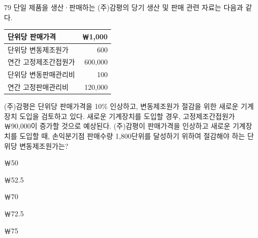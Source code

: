 \begin{question}{79}
단일 제품을 생산·판매하는 (주)감평의 당기 생산 및 판매 관련 자료는 다음과 같다.
\par{\small\centering\begin{tabular}{|l|r|}\hline
단위당 판매가격 & ￦1,000 \\ \hline
단위당 변동제조원가 & 600 \\ \hline
연간 고정제조간접원가 & 600,000 \\ \hline
단위당 변동판매관리비 & 100 \\ \hline
연간 고정판매관리비 & 120,000 \\ \hline
\end{tabular}\par}
(주)감평은 단위당 판매가격을 10\% 인상하고, 변동제조원가 절감을 위한 새로운 기계장치 도입을 검토하고 있다. 새로운 기계장치를 도입할 경우, 고정제조간접원가 ￦90,000이 증가할 것으로 예상된다. (주)감평이 판매가격을 인상하고 새로운 기계장치를 도입할 때, 손익분기점 판매수량 1,800단위를 달성하기 위하여 절감해야 하는 단위당 변동제조원가는?
\begin{choices}
  \item ￦50
  \item ￦52.5
  \item ￦70
  \item ￦72.5
  \item ￦75
\end{choices}
\end{question}

